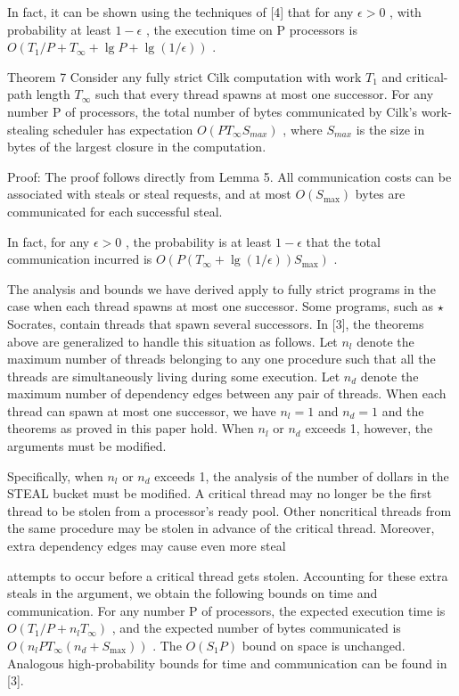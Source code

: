 \documentclass[
]{article}
\begin{document}
In fact, it can be shown using the techniques of {[}4{]} that for any
\(\epsilon > 0\) , with probability at least \(1 - \epsilon\) , the
execution time on P processors is
\(O(T_{1}/P + T_{\infty} + \lg P + \lg(1/\epsilon))\) .

Theorem 7 Consider any fully strict Cilk computation with work \(T_{1}\)
and critical-path length \(T_{\infty}\) such that every thread spawns at
most one successor. For any number P of processors, the total number of
bytes communicated by Cilk's work-stealing scheduler has expectation
\(O(PT_{\infty}S_{max})\) , where \(S_{max}\) is the size in bytes of
the largest closure in the computation.

Proof: The proof follows directly from Lemma 5. All communication costs
can be associated with steals or steal requests, and at most
\(O(S_{\max})\) bytes are communicated for each successful steal.

In fact, for any \(\epsilon > 0\) , the probability is at least
\(1 - \epsilon\) that the total communication incurred is
\(O(P(T_{\infty} + \lg(1/\epsilon))S_{\max})\) .

The analysis and bounds we have derived apply to fully strict programs
in the case when each thread spawns at most one successor. Some
programs, such as \(\star\) Socrates, contain threads that spawn several
successors. In {[}3{]}, the theorems above are generalized to handle
this situation as follows. Let \(n_l\) denote the maximum number of
threads belonging to any one procedure such that all the threads are
simultaneously living during some execution. Let \(n_d\) denote the
maximum number of dependency edges between any pair of threads. When
each thread can spawn at most one successor, we have \(n_l = 1\) and
\(n_d = 1\) and the theorems as proved in this paper hold. When \(n_l\)
or \(n_d\) exceeds 1, however, the arguments must be modified.

Specifically, when \(n_{l}\) or \(n_{d}\) exceeds 1, the analysis of the
number of dollars in the STEAL bucket must be modified. A critical
thread may no longer be the first thread to be stolen from a processor's
ready pool. Other noncritical threads from the same procedure may be
stolen in advance of the critical thread. Moreover, extra dependency
edges may cause even more steal

attempts to occur before a critical thread gets stolen. Accounting for
these extra steals in the argument, we obtain the following bounds on
time and communication. For any number P of processors, the expected
execution time is \(O(T_{1}/P + n_{l}T_{\infty})\) , and the expected
number of bytes communicated is
\(O(n_{l}PT_{\infty}(n_{d} + S_{\max}))\) . The \(O(S_{1}P)\) bound on
space is unchanged. Analogous high-probability bounds for time and
communication can be found in {[}3{]}.
\end{document}
